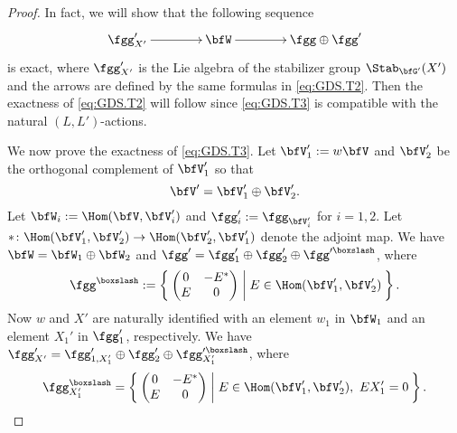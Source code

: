 \documentclass[12pt,a4paper]{amsart}
\newcommand{\trivial}[2][]{\if\relax\detokenize{#1}\relax
  {%
      \color{orange} \vspace{0em} $[$  #2 $]$
      \color{black}
  }
  \else
\ifx#1h
\ifcsname showtrivial\endcsname
{%
    \color{orange} \vspace{0em}  $[$ #2 $]$
    \color{black}
}
\fi
\else {\red Wrong argument!} \fi
\fi
}
\numberwithin{equation}{section}
\theoremstyle{remark}
\begin{document}
\begin{proof}
    In fact, we will show that the following sequence
    \begin{equation}\label{eq:GDS.T3}
      \xymatrix@C=4em{
        \fgg'_{X'} \ar[r]& \bfW \ar[r] & \fgg\oplus \fgg'
      }
    \end{equation}
    is exact, where $\fgg'_{X'}$ is the Lie algebra of the stabilizer group $\Stab_{\bfG'}(X')$ and
  the  arrows are defined by the same formulas in \cref{eq:GDS.T2}. Then the
    exactness of \cref{eq:GDS.T2} will follow since \cref{eq:GDS.T3} is compatible
    with the natural $(L,L')$-actions. %

    We now prove the exactness of \cref{eq:GDS.T3}.
    Let $\bfV'_1:=w\bfV$ and $\bfV'_2$ be the orthogonal complement of
    $\bfV'_1$ so that \[ \bfV' = \bfV'_1\oplus
    \bfV'_2.
    \]
    Let $\bfW_i := \Hom(\bfV,\bfV'_i)$ and $\fgg'_i := \fgg_{\bfV'_i}$ for
    $i=1,2$. Let
    $*\colon \Hom(\bfV'_1,\bfV'_2) \rightarrow \Hom(\bfV'_2,\bfV'_1)$ denote the
    adjoint map.  We have $\bfW =\bfW_1\oplus \bfW_2$ and $\fgg' = \fgg'_{1}\oplus \fgg'_2 \oplus \fgg'^{\boxslash}$, where
    \[ \fgg^{\boxslash}:= \Set{\begin{pmatrix}
          0 & -E^*\\
          E & 0
        \end{pmatrix}|E\in \Hom(\bfV'_1,\bfV'_2)}.
    \]
    Now $w$ and $X'$ are naturally identified with an element
    $w_1$ in $\bfW_1$
    and an element $X_1'$ in  $\fgg'_1$, respectively.  We have $\fgg'_{X'} = \fgg'_{1,X'_1}\oplus \fgg'_2 \oplus \fgg'^{\boxslash}_{X'_1}$, where %
    \[ \fgg^{\boxslash}_{X'_1} = \Set{\begin{pmatrix}
          0 & -E^*\\
          E & 0
        \end{pmatrix}|E\in \Hom(\bfV'_1,\bfV'_2),\ E X'_1 = 0}.
    \]


\end{proof}
\end{document}
